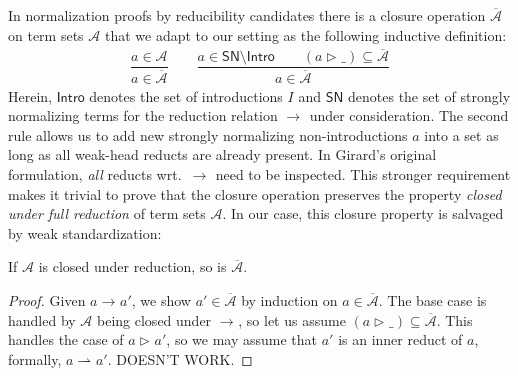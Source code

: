 \documentclass[a4paper,USenglish,cleveref, autoref, thm-restate]{lipics-v2019}
\newcommand{\ru}{\dfrac}
\newcommand{\whd}[1][]{\rhd_{#1}}
\newcommand{\red}[1][]{\longrightarrow_{#1}}
\newcommand{\inner}[1][]{\rightharpoonup_{#1}}
\newcommand{\cl}[1]{\overline{#1}}
\newcommand{\A}{\mathcal{A}}
\newcommand{\SN}{\mathsf{SN}}
\newcommand{\Intro}{\mathsf{Intro}}
\begin{document}
In normalization proofs by reducibility candidates there is a closure
operation $\cl\A$ on term sets $\A$ that we adapt to our setting as
the following inductive definition:
\begin{gather*}
  \ru{a \in \A
    }{a \in \cl\A}
\qquad
  \ru{a \in \SN \setminus \Intro \qquad
      (a \whd \_) \subseteq \cl\A
    }{a \in \cl\A}
\end{gather*}
Herein, $\Intro$ denotes the set of introductions $I$ and $\SN$
denotes the set of strongly normalizing terms for the reduction
relation $\red$ under consideration.  The second rule allows us to add
new strongly normalizing non-introductions $a$ into a set as long as
all weak-head reducts are already present.  In Girard's original
formulation, \emph{all} reducts wrt.\ $\red$ need to be inspected.
This stronger requirement makes it trivial to prove that the closure
operation preserves the property \emph{closed under full reduction} of
term sets $\A$.  In our case, this closure property is salvaged by
weak standardization:
\begin{lemma}
  If $\A$ is closed under reduction, so is $\cl\A$.
\end{lemma}
\begin{proof}
  Given $a \red a'$, we show $a' \in \cl\A$ by induction on $a \in
  \cl\A$.  The base case is handled by $\A$ being closed under $\red$,
  so let us assume $(a \whd \_) \subseteq \cl\A$.  This handles the
  case of $a \whd a'$, so we may assume that $a'$ is an inner reduct
  of $a$, formally, $a \inner a'$.
  DOESN'T WORK.
\end{proof}





\end{document}
